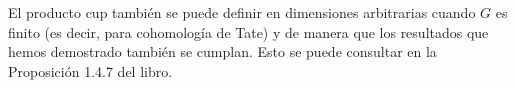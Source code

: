 \documentclass[a4paper,12pt, leqno]{article}
\begin{document}
	
	
	El producto cup también se puede definir en dimensiones arbitrarias cuando $G$ es finito (es decir, para cohomología de Tate) y de manera que los resultados que hemos demostrado también se cumplan. Esto se puede consultar en la Proposición 1.4.7 del libro. 
	
\end{document}
